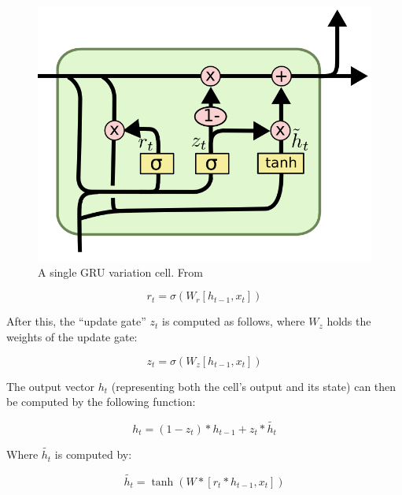 \begin{figure}[H]
	\begin{center}
		\includegraphics[scale=0.5]{rnn/gru_cell}
	\end{center}
	\caption{A single GRU variation cell. From~\cite{olah2015understanding}\label{fig:gru_cell}}
\end{figure}

\begin{equation} \label{eq:gru_reset_gate}
r_t = \sigma(W_r [h_{t-1}, x_t])
\end{equation}

After this, the \enquote{update gate} \(z_t\) is computed as follows, where \(W_z\) holds the weights of the update gate:

\begin{equation} \label{eq:gru_update_gate}
z_t = \sigma(W_z [h_{t-1}, x_t])
\end{equation}

The output vector \(h_t\) (representing both the cell's output and its state) can then be computed by the following function:

\begin{equation} \label{eq:gru_output}
h_t = (1 - z_t) * h_{t-1} + z_t * \tilde{h_t}
\end{equation}

Where \(\tilde{h_t}\) is computed by:

\begin{equation} \label{eq:gru_output_partial}
\tilde{h_t} = \tanh(W * [r_t * h_{t-1}, x_t])
\end{equation}

